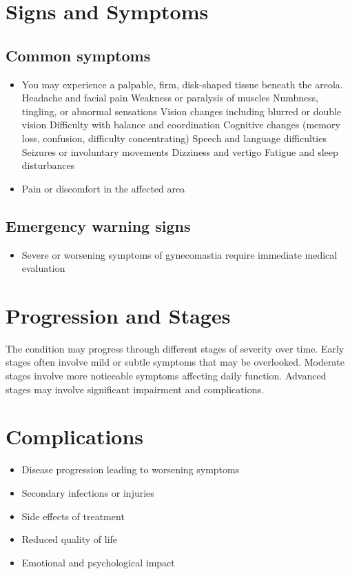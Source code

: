 \section{Signs and Symptoms}
\subsection{Common symptoms}
\begin{itemize}[noitemsep]
  \item You may experience a palpable, firm, disk-shaped tissue beneath the areola. Headache and facial pain Weakness or paralysis of muscles Numbness, tingling, or abnormal sensations Vision changes including blurred or double vision Difficulty with balance and coordination Cognitive changes (memory loss, confusion, difficulty concentrating) Speech and language difficulties Seizures or involuntary movements Dizziness and vertigo Fatigue and sleep disturbances
  \item Pain or discomfort in the affected area
  \end{itemize}
\subsection{Emergency warning signs}
\begin{itemize}[noitemsep]
  \item Severe or worsening symptoms of gynecomastia require immediate medical evaluation
\end{itemize}
\section{Progression and Stages}
The condition may progress through different stages of severity over time. Early stages often involve mild or subtle symptoms that may be overlooked. Moderate stages involve more noticeable symptoms affecting daily function. Advanced stages may involve significant impairment and complications.
\section{Complications}
\begin{itemize}[noitemsep]
  \item Disease progression leading to worsening symptoms
  \item Secondary infections or injuries
  \item Side effects of treatment
  \item Reduced quality of life
  \item Emotional and psychological impact
\end{itemize}
